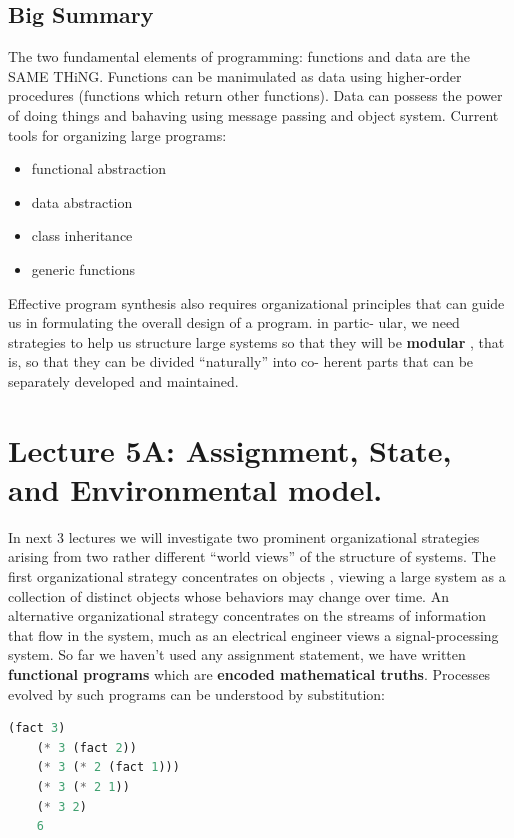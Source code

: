 \documentclass[a4paper,twoside]{article}
\numberwithin{equation}{section}
\begin{document}
\subsection{Big Summary}
The two fundamental elements of programming: functions and data are the SAME THiNG.
Functions can be manimulated as data using higher-order procedures (functions which return other
functions). Data can possess the power of doing things and bahaving using message passing and
object system. Current tools for organizing large programs:
\begin{itemize}
    \item functional abstraction
    \item data abstraction
    \item class inheritance
    \item generic functions
\end{itemize}
Effective program synthesis also requires organizational principles that
can guide us in formulating the overall design of a program. in partic-
ular, we need strategies to help us structure large systems so that they
will be \textbf{modular} , that is, so that they can be divided “naturally” into co-
herent parts that can be separately developed and maintained.

\section{Lecture 5A: Assignment, State, and Environmental model.}
In next 3 lectures we will investigate two prominent organizational strategies arising from
two rather different “world views” of the structure of systems.
The first organizational strategy concentrates on objects , viewing a large system
as a collection of distinct objects whose behaviors may change over
time. An alternative organizational strategy concentrates on the streams
of information that ﬂow in the system, much as an electrical engineer
views a signal-processing system. So far we haven't used any assignment
statement, we have written \textbf{functional programs} which are \textbf{encoded mathematical truths}.
Processes evolved by such programs can be understood by substitution:

\begin{lstlisting}[language=Python]
    (fact 3)
    (* 3 (fact 2))
    (* 3 (* 2 (fact 1)))
    (* 3 (* 2 1))
    (* 3 2)
    6
\end{lstlisting}
\end{document}
